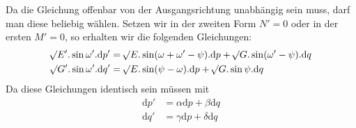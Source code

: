 Da die Gleichung offenbar von der Ausgangsrichtung unabhängig sein muss, darf man diese beliebig wählen. Setzen wir in der zweiten Form \(N'=0\) oder in der ersten \(M'=0\), so erhalten wir die folgenden Gleichungen:
\[
\begin{aligned}
\mathord{{}^{}\!\surd}E'\mathord{.}\sin\omega'\mathord{.}\mathrm{d}p'&=\mathord{{}^{}\!\surd}E\mathord{.}\sin(\omega+\omega'-\psi)\mathord{.}\mathrm{d}p+\mathord{{}^{}\!\surd}G\mathord{.}\sin(\omega'-\psi)\mathord{.}\mathrm{d}q\\
\mathord{{}^{}\!\surd}G'\mathord{.}\sin\omega'\mathord{.}\mathrm{d}q'&=\mathord{{}^{}\!\surd}E\mathord{.}\sin(\psi-\omega)\mathord{.}\mathrm{d}p+\mathord{{}^{}\!\surd}G\mathord{.}\sin\psi\mathord{.}\mathrm{d}q
\end{aligned}
\]
Da diese Gleichungen identisch sein müssen mit
\[
\begin{aligned}
\mathrm{d}p'&=\alpha\mathrm{d}p+\beta\mathrm{d}q\\
\mathrm{d}q'&=\gamma\mathrm{d}p+\delta\mathrm{d}q
\end{aligned}
\]
